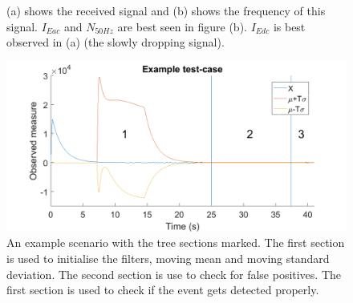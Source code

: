 \begin{figure}
	\centering     %
	\caption{(a) shows the received signal and (b) shows the frequency of this signal. $I_{Eac}$ and $N_{50Hz}$ are best seen in figure (b). $I_{Edc}$ is best observed in (a) (the slowly dropping signal).\label{fig:signalsinestsetup}}
\end{figure}

\begin{figure}
	\centering     %
	\includegraphics[width=\textwidth]{pics/Examplescenario.png}
	\caption{An example scenario with the tree sections marked. The first section is used to initialise the filters, moving mean and moving standard deviation. The second section is use to check for false positives. The first section is used to check if the event gets detected properly. \label{TestScenario}}
\end{figure}

